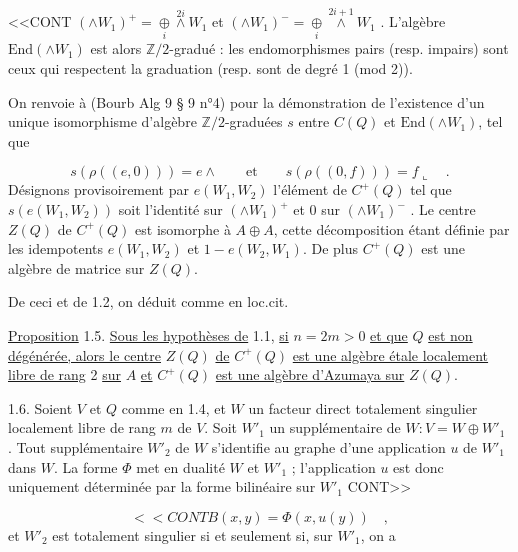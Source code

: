 
<<CONT $(\wedge W_1)^+ = \underset{i}{\oplus} \overset{2i}{\wedge} W_1$ et $(\wedge W_1)^- = \underset{i}{\oplus} \overset{2i+1}{\wedge} W_1$ . L'algèbre $\mathrm{End}(\wedge W_1)$ est alors $\mathbb{Z}/2$-gradué : les endomorphismes pairs (resp. impairs) sont ceux qui respectent la graduation (resp. sont de degré 1 (mod 2)).

On renvoie à (Bourb Alg 9 § 9 n°4) pour la démonstration de l'existence d'un unique isomorphisme d'algèbre $\mathbb{Z}/2$-graduées $s$ entre $C(Q)$ et $\mathrm{End}(\wedge W_1)$, tel que

\begin{equation*}
s(\rho((e,0))) = e \wedge \qquad \mbox{et} \qquad s(\rho((0,f))) = f \llcorner \quad .
\end{equation*}
Désignons provisoirement par $e(W_1,W_2)$ l'élément de $C^+(Q)$ tel que $s(e(W_1,W_2))$ soit l'identité sur $(\wedge W_1)^+$ et $0$ sur $(\wedge W_1)^-$ . Le centre $Z(Q)$ de $C^+(Q)$ est isomorphe à $A \oplus A$, cette décomposition étant définie par les idempotents $e(W_1,W_2)$ et $1 - e(W_2,W_1)$. De plus $C^+(Q)$ est une algèbre de matrice sur $Z(Q)$.

De ceci et de 1.2, on déduit comme en loc.cit.

\underline{Proposition} 1.5. \underline{Sous les hypothèses de} 1.1, \underline{si} $n = 2m > 0$ \underline{et que} $Q$ \underline{est non dégénérée, alors le centre} $Z(Q)$ \underline{de} $C^+(Q)$ \underline{est une algèbre étale localement libre de rang} 2 \underline{sur} $A$ \underline{et} $C^+(Q)$ \underline{est une algèbre d'Azumaya sur} $Z(Q)$.

1.6. Soient $V$ et $Q$ comme en 1.4, et $W$ un facteur direct totalement singulier localement libre de rang $m$ de $V$. Soit $W'_1$ un supplémentaire de $W : V = W \oplus W'_1$ . Tout supplémentaire $W'_2$ de $W$ s'identifie au graphe d'une application $u$ de $W'_1$ dans $W$. La forme $\Phi$ met en dualité $W$ et $W'_1$ ; l'application $u$ est donc uniquement déterminée par la forme bilinéaire sur $W'_1$ CONT>>



\begin{equation*}
<<CONT B(x,y) = \Phi(x,u(y)) \quad ,
\end{equation*}
et $W'_2$ est totalement singulier si et seulement si, sur $W'_1$, on a

